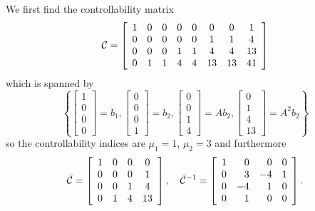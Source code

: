 \documentclass{article}
\begin{document}
We first find the controllability matrix
$$
\mathcal{C} =
\left[\begin{array}{c c c c c c c c}
  1 & 0 & 0 & 0 & 0 &  0 &  0 &  1 \\
  0 & 0 & 0 & 0 & 0 &  1 &  1 &  4 \\
  0 & 0 & 0 & 1 & 1 &  4 &  4 & 13 \\
  0 & 1 & 1 & 4 & 4 & 13 & 13 & 41
\end{array}\right]
$$
which is spanned by
$$
\left\{
  \left[\begin{array}{c}
    1 \\ 0 \\ 0 \\ 0
  \end{array}\right] = b_1,
  \left[\begin{array}{c}
    0 \\ 0 \\ 0 \\ 1
  \end{array}\right] = b_2,
  \left[\begin{array}{c}
    0 \\ 0 \\ 1 \\ 4
  \end{array}\right] = Ab_2,
  \left[\begin{array}{c}
    0 \\ 1 \\ 4 \\ 13
  \end{array}\right] = A^2b_2
\right\}
$$
so the controllability indices are $\mu_1 = 1$, $\mu_2 = 3$ and
furthermore
$$
\bar{\mathcal{C}} =
  \left[\begin{array}{c c c c}
    1 & 0 & 0 &  0 \\
    0 & 0 & 0 &  1 \\
    0 & 0 & 1 &  4 \\
    0 & 1 & 4 & 13
  \end{array}\right], \quad
\bar{\mathcal{C}}^{-1} =
  \left[\begin{array}{r r r r}
    1 &  0 &  0 &  0 \\
    0 &  3 & -4 &  1 \\
    0 & -4 &  1 &  0 \\
    0 &  1 &  0 &  0
  \end{array}\right].
$$
\end{document}
